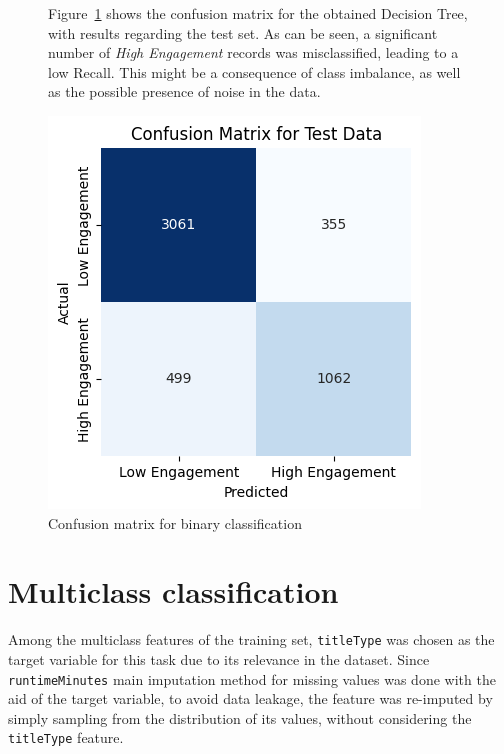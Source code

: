 \begin{figure}[h]
    \begin{minipage}{0.58\textwidth}
        Figure~\ref{fig:conf_matr_binary_dt} shows the confusion matrix for the obtained
        Decision Tree, with results regarding the test set.
        As can be seen, a significant number of \textit{High Engagement} records was misclassified,
        leading to a low Recall.
        This might be a consequence of class imbalance, as well as the possible presence
        of noise in the data.
    \end{minipage}
    \hfill
    \begin{minipage}{0.38\textwidth}
        \includegraphics[width=\linewidth]{plots/binary_dt_confusion_matrix.png}
        \captionsetup{justification=centering, width=0.9\linewidth}
        \caption{Confusion matrix for binary classification}
        \label{fig:conf_matr_binary_dt}
    \end{minipage}
\end{figure}


\section{Multiclass classification}\label{sec:multiclass_classification}
Among the multiclass features of the training set, \texttt{titleType}
was chosen as the target variable for this task due to its relevance in the dataset.
Since \texttt{runtimeMinutes} main imputation method for missing values was done
with the aid of the target variable, to avoid data leakage, the feature was re-imputed
by simply sampling from the distribution of its values, without considering the \texttt{titleType}
feature.\\


